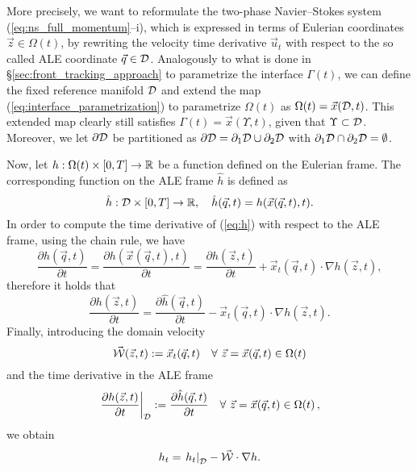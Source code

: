 More precisely, we want to reformulate the two-phase Navier--Stokes system
(\ref{eq:ns_full_momentum}--i), which is expressed in terms of Eulerian
coordinates $\vec z\in\Omega(t)$,
by rewriting the velocity time derivative $\vec u_t$ with
respect to the so called ALE coordinate $\vec q \in \mathcal D$.
Analogously to what is done
in \S\ref{sec:front_tracking_approach} to parametrize the interface
$\Gamma(t)$, we can define the fixed reference manifold $\mathcal D$ and extend the map
(\ref{eq:interface_parametrization}) to parametrize $\Omega(t)$ as
$\Omega(t)=\vec x(\mathcal D,t)$. This extended map clearly still satisfies $\Gamma(t)
= \vec x(\Upsilon,t)$, given that $\Upsilon\subset\mathcal D$. Moreover, we let
$\partial\mathcal D$ be partitioned as ${\partial\mathcal D=\partial_1\mathcal D \cup \partial_2\mathcal D}$
with $\partial_1\mathcal D \cap \partial_2\mathcal D = \emptyset$.

Now, let $h:\Omega(t)\times [0,T]\to \mathbb R$ be a function defined on the Eulerian
frame. The corresponding function on the ALE frame $\hat h$ is defined as
\begin{equation}\label{eq:h}
\hat h:\mathcal D\times [0,T]\to \mathbb R,\quad \hat h(\vec q,t)=h(\vec x(\vec q,t),t).
\end{equation}
In order to compute the time derivative of (\ref{eq:h}) with respect to the ALE
frame, using the chain rule, we have
\begin{equation}
\frac{\partial\hat h(\vec q,t)}{\partial t}=\frac{\partial h(\vec x(\vec
q,t),t)}{\partial t}=\frac{\partial h(\vec z,t)}{\partial t}+\vec x_t(\vec q,t)
\cdot \nabla h(\vec z,t),
\end{equation}
therefore it holds that
\begin{equation}
\frac{\partial h(\vec z,t)}{\partial t} =
\frac{\partial\hat h(\vec q,t)}{\partial t}-
\vec x_t(\vec q,t) \cdot \nabla h(\vec z,t).
\end{equation}
Finally, introducing the domain velocity
\begin{equation} \label{eq:W}
\vec{\mathcal W}(\vec z, t) := \vec x_t(\vec q, t) \quad \forall\ \vec z = \vec x(\vec q,t)
\in \Omega(t)
\end{equation}
and the time derivative in the ALE frame
\begin{equation} \label{eq:ale_derivative}
\left.\frac{\partial h(\vec z,t)}{\partial t}\right|_{\mathcal D}:=
\frac{\partial\hat h(\vec q,t)}{\partial t} \quad
\forall\ \vec z = \vec x(\vec q,t) \in \Omega(t)\,,
\end{equation}
we obtain
\begin{equation}\label{eq:ale_dt}
h_t =\left.h_t\right|_{\mathcal D} -\vec{\mathcal{W}} \cdot \nabla h.
\end{equation}
